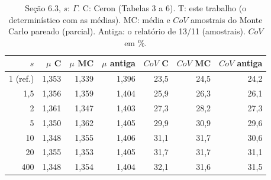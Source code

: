 \begin{table}[htbp]\centering\scriptsize\setlength{\tabcolsep}{3pt}
\caption{Seção 6.3, $s$: $\Gamma$. C: Ceron (Tabelas 3 a 6). T: este trabalho (o determinístico com as médias). MC: média e $CoV$ amostrais do Monte Carlo pareado (parcial). Antiga: o relatório de 13/11 (amostrais). $CoV$ em \%.}\label{tab:g_s}
\begin{tabular}{rrrrrrr}\toprule
$s$ & $\mu$ C & $\mu$ MC & $\mu$ antiga & $CoV$ C & $CoV$ MC & $CoV$ antiga \\\midrule
1 (ref.) & 1{,}353 & 1{,}339 & 1{,}396 & 23{,}5 & 24{,}5 & 24{,}2 \\
1{,}5 & 1{,}356 & 1{,}359 & 1{,}404 & 25{,}9 & 26{,}3 & 26{,}1 \\
2 & 1{,}361 & 1{,}347 & 1{,}403 & 27{,}3 & 28{,}2 & 27{,}3 \\
5 & 1{,}350 & 1{,}362 & 1{,}405 & 29{,}9 & 30{,}9 & 29{,}6 \\
10 & 1{,}348 & 1{,}355 & 1{,}406 & 31{,}1 & 31{,}7 & 30{,}6 \\
20 & 1{,}355 & 1{,}353 & 1{,}405 & 31{,}7 & 31{,}7 & 31{,}1 \\
400 & 1{,}348 & 1{,}354 & 1{,}404 & 32{,}1 & 31{,}6 & 31{,}5 \\
\bottomrule\end{tabular}\end{table}
